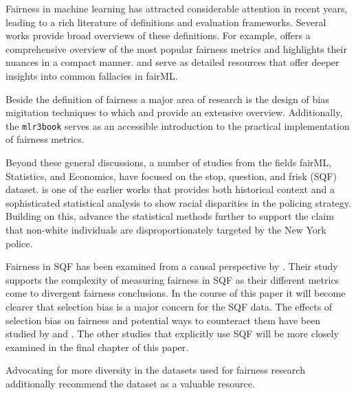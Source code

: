Fairness in machine learning has attracted considerable attention in recent years, leading to a rich literature of definitions and evaluation frameworks. Several works provide broad overviews of these definitions. For example, \cite{verma2018} offers a comprehensive overview of the most popular fairness metrics and \cite{castelnovo2022} highlights their nuances in a compact manner. \cite{corbett-davies} and \cite{barocas} serve as detailed resources that offer deeper insights into common fallacies in fairML.

Beside the definition of fairness a major area of research is the design of bias migitation techniques to which \cite{mehrabi2022} and \cite{caton2024} provide an extensive overview. Additionally, the \texttt{mlr3book} serves as an accessible introduction to the practical implementation of fairness metrics.

Beyond these general discussions, a number of studies from the fields fairML, Statistics, and Economics, have focused on the stop, question, and frisk (SQF) dataset. \cite{gelman2007} is one of the earlier works that provides both historical context and a sophisticated statistical analysis to show racial disparities in the policing strategy. Building on this, \cite{goel2016} advance the statistical methods further to support the claim that non-white individuals are disproportionately targeted by the New York police.

Fairness in SQF has been examined from a causal perspective by \cite{Khademi2019FADMELC}. Their study supports the complexity of measuring fairness in SQF as their different metrics come to divergent fairness conclusions. In the course of this paper it will become clearer that selection bias is a major concern for the SQF data. The effects of selection bias on fairness and potential ways to counteract them have been studied by \cite{Lakkaraju2017SLPEAPPU} and \cite{favier2023}.
The other studies that explicitly use SQF \cite{Badr2022DTFANSP, RambachanBBOEFW, kallus2018} will be more closely examined in the final chapter of this paper.

Advocating for more diversity in the datasets used for fairness research additionally \cite{Fabris_2022} recommend the dataset as a valuable resource.

